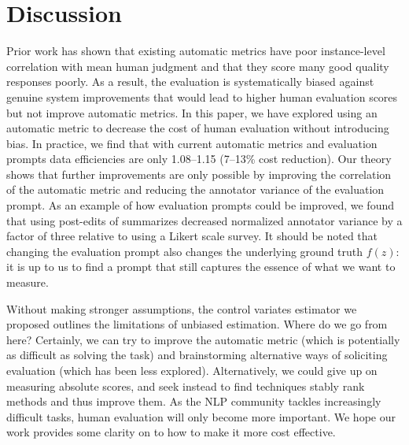 \section{Discussion}
\label{sec:discussion}

Prior work has shown that existing automatic metrics have poor instance-level correlation with mean human judgment and that they score many good quality responses poorly.
As a result, the evaluation is systematically biased against genuine system improvements that would lead to higher human evaluation scores but not improve automatic metrics.
In this paper, we have explored using an automatic metric to decrease the cost of human evaluation without introducing bias.
In practice, we find that with current automatic metrics and evaluation prompts data efficiencies are only 1.08--1.15 (7--13\% cost reduction).
Our theory shows that further improvements are only possible by improving the correlation of the automatic metric and reducing the annotator variance of the evaluation prompt.
As an example of how evaluation prompts could be improved, we found that using post-edits of summarizes decreased normalized annotator variance by a factor of three relative to using a Likert scale survey.
It should be noted that changing the evaluation prompt also changes the underlying ground truth $f(z)$: it is up to us to find a prompt that still captures the essence of what we want to measure.


Without making stronger assumptions, the control variates estimator we proposed outlines the limitations of unbiased estimation.
Where do we go from here?
Certainly, we can try to improve the automatic metric (which is potentially as difficult as solving the task) and brainstorming alternative ways of soliciting evaluation (which has been less explored).
Alternatively, we could give up on measuring absolute scores, and seek instead to find techniques stably rank methods and thus improve them.
As the NLP community tackles increasingly difficult tasks, human evaluation will only become more important.
We hope our work provides some clarity on to how to make it more cost effective.





